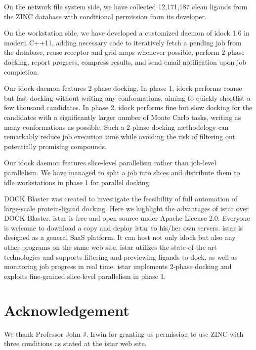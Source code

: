 \documentclass{bioinfo}
\begin{document}
On the network file system side, we have collected 12,171,187 clean ligands from the ZINC database \citep{532,1178} with conditional permission from its developer.

On the workstation side, we have developed a customized daemon of idock 1.6 in modern C++11, adding necessary code to iteratively fetch a pending job from the database, reuse receptor and grid maps whenever possible, perform 2-phase docking, report progress, compress results, and send email notification upon job completion.

Our idock daemon features 2-phase docking. In phase 1, idock performs coarse but fast docking without writing any conformations, aiming to quickly shortlist a few thousand candidates. In phase 2, idock performs fine but slow docking for the candidates with a significantly larger number of Monte Carlo tasks, writing as many conformations as possible. Such a 2-phase docking methodology can remarkably reduce job execution time while avoiding the risk of filtering out potentially promising compounds.

Our idock daemon features slice-level parallelism rather than job-level parallelism. We have managed to split a job into slices and distribute them to idle workstations in phase 1 for parallel docking.

DOCK Blaster \citep{557} was created to investigate the feasibility of full automation of large-scale protein-ligand docking. Here we highlight the advantages of istar over DOCK Blaster. istar is free and open source under Apache License 2.0. Everyone is welcome to download a copy and deploy istar to his/her own servers. istar is designed as a general SaaS platform. It can host not only idock but also any other programs on the same web site. istar utilizes the state-of-the-art technologies and supports filtering and previewing ligands to dock, as well as monitoring job progress in real time. istar implements 2-phase docking and exploits fine-grained slice-level parallelism in phase 1.

\section*{Acknowledgement}

We thank Professor John J. Irwin for granting us permission to use ZINC with three conditions as stated at the istar web site.



\end{document}
